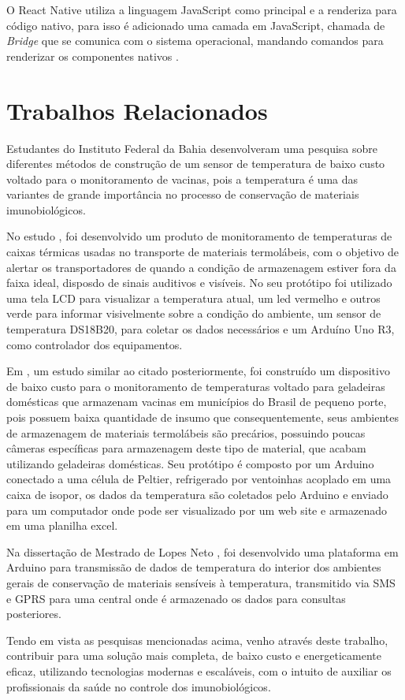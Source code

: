 O React Native utiliza a linguagem JavaScript como principal e a renderiza para código nativo, para isso é adicionado uma camada em JavaScript, chamada de \textit{Bridge} que se comunica com o sistema operacional, mandando comandos para renderizar os componentes nativos \cite{docreactnative}.

\section{Trabalhos Relacionados}
\label{fund:trabalhos-relacionados}
Estudantes do Instituto Federal da Bahia desenvolveram uma pesquisa \cite{cruzdesenvolvimento} sobre diferentes métodos de construção de um sensor de temperatura de baixo custo voltado para o monitoramento de vacinas, pois a temperatura é uma das variantes de grande importância no  processo de conservação de materiais imunobiológicos.

No estudo \cite{lima2019controle}, foi desenvolvido um produto de monitoramento de temperaturas de caixas térmicas usadas no transporte de materiais termolábeis, com o  objetivo de alertar os transportadores de quando a condição de armazenagem estiver fora da faixa ideal, disposdo de sinais auditivos e visíveis. No seu protótipo foi utilizado uma tela LCD para visualizar a temperatura atual, um led vermelho e outros verde para informar visivelmente sobre a condição do ambiente, um sensor de temperatura DS18B20, para coletar os dados necessários e um Arduíno Uno R3, como controlador dos equipamentos.

Em \cite{kersbaum2019monitoramento}, um estudo similar ao citado posteriormente, foi construído um dispositivo de baixo custo para o monitoramento de temperaturas voltado para geladeiras domésticas que armazenam vacinas em municípios do Brasil de pequeno porte, pois possuem baixa quantidade de insumo que consequentemente, seus ambientes de armazenagem de materiais termolábeis são precários, possuindo poucas câmeras específicas para armazenagem deste tipo de material, que acabam utilizando geladeiras domésticas. Seu protótipo é composto por um Arduino conectado a uma célula de Peltier, refrigerado por ventoinhas acoplado em uma caixa de isopor, os dados da temperatura são coletados pelo Arduino e enviado para um computador onde pode ser visualizado por um web site e armazenado em uma planilha excel.

Na dissertação de Mestrado de Lopes Neto \cite{lopes2019monitoramento}, foi desenvolvido uma plataforma em Arduino para transmissão de dados de temperatura do interior dos ambientes gerais de conservação de materiais sensíveis à temperatura, transmitido via SMS e GPRS para uma central onde é armazenado os dados para consultas posteriores.

Tendo em vista as pesquisas mencionadas acima, venho através deste trabalho, contribuir para uma solução mais completa, de baixo custo e energeticamente eficaz, utilizando tecnologias modernas e escaláveis, com o intuito de auxiliar os profissionais da saúde no controle dos imunobiológicos.